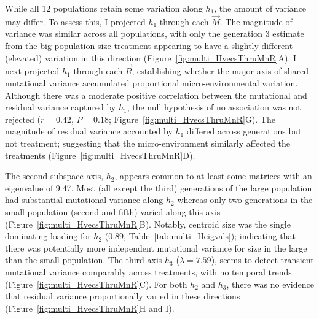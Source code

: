 While all 12 populations retain some variation along $h_1$, the amount of variance may differ. To assess this, I projected $h_1$ through each $\vec{M}$. The magnitude of variance was similar across all populations, with only the generation 3 estimate from the big population size treatment appearing to have a slightly different (elevated) variation in this direction (Figure~\ref{fig:multi_HvecsThruMnR}A). I next projected $h_1$ through each $\vec{R}$, establishing whether the major axis of shared mutational variance accumulated proportional micro-environmental variation. Although there was a moderate positive correlation between the mutational and residual variance captured by $h_1$, the null hypothesis of no association was not rejected ($r = 0.42$, $P = 0.18$; Figure~\ref{fig:multi_HvecsThruMnR}G). The magnitude of residual variance accounted by $h_1$ differed across generations but not treatment; suggesting that the micro-environment similarly affected the treatments (Figure~\ref{fig:multi_HvecsThruMnR}D). \par

The second subspace axis, $h_2$, appears common to at least some matrices with an eigenvalue of 9.47. Most (all except the third) generations of the large population had substantial mutational variance along $h_2$ whereas only two generations in the small population (second and fifth) varied along this axis (Figure~\ref{fig:multi_HvecsThruMnR}B). Notably, centroid size was the single dominating loading for $h_2$ (0.89, Table~\ref{tab:multi_Heigvals}); indicating that there was potentially more independent mutational variance for size in the large than the small population. The third axis $h_3$ ($\lambda = 7.59$), seems to detect transient mutational variance comparably across treatments, with no temporal trends (Figure~\ref{fig:multi_HvecsThruMnR}C). For both $h_2$ and $h_3$, there was no evidence that residual variance proportionally varied in these directions (Figure~\ref{fig:multi_HvecsThruMnR}H and I).\par


